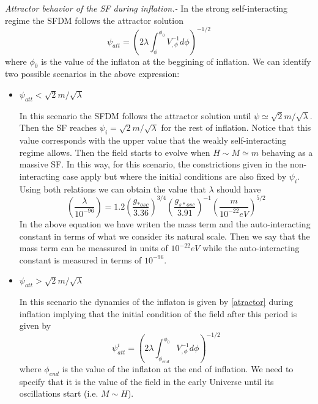 \documentclass[amssymb,twocolumn,prd,nofootinbib,showpacs]{revtex4-1}
\begin{document}
\textit{Attractor behavior of the SF during inflation.-} In the strong self-interacting regime the SFDM follows the attractor solution \cite{curvatonatractor}
\begin{equation}\label{atractor}
\psi_{att} =\left(2\lambda\int_{\phi}^{\phi_0}V^{-1}_{,\phi}d\phi\right)^{-1/2}
\end{equation}
where $\phi_0$ is the value of the inflaton at the beggining of inflation. We can identify two possible scenarios in the above expression:
\begin{itemize}
\item $\psi_{att}<\sqrt{2}m/\sqrt{\lambda}$

In this scenario the SFDM follows the attractor solution until $\psi\simeq \sqrt{2}m/\sqrt{\lambda}$. Then the SF reaches $\psi_i=\sqrt{2}m/\sqrt{\lambda}$ for the rest of inflation. Notice that this value corresponds with the upper value that the weakly self-interacting regime allows. Then the field starts to evolve when $H\sim M\simeq m$ behaving as a massive SF. In this way, for this scenario, the constrictions given in the non-interacting case apply but where the initial conditions are also fixed by $\psi_i$. Using both relations we can obtain the value that $\lambda$ should have
\begin{equation}\label{wregime}
\left(\frac{\lambda}{10^{-96}}\right)=1.2\left(\frac{g_{*osc}}{3.36}\right)^{3/4}\left(\frac{g_{s*osc}}{3.91}\right)^{-1}\left(\frac{m}{10^{-22}eV}\right)^{5/2}
\end{equation}
In the above equation we have writen the mass term and the auto-interacting constant in terms of what we consider its natural scale. Then we say that the mass term can be meassured in units of $10^{-22}eV$ while the auto-interacting constant is measured in terms of $10^{-96}$.
\\

\item $\psi_{att}>\sqrt{2}m/\sqrt{\lambda}$

In this scenario the dynamics of the inflaton is given by \eqref{atractor} during inflation implying that the initial condition of the field after this period is given by
\begin{equation}\label{atractor2}
\psi_{att}^i = \left(2\lambda\int_{\phi_{end}}^{\phi_0}V^{-1}_{,\phi}d\phi\right)^{-1/2}
\end{equation}
where $\phi_{end}$ is the value of the inflaton at the end of inflation. We need to specify that it is the value of the field in the early Universe until its oscillations start (i.e. $M\sim H$).


\end{itemize}
\end{document}

